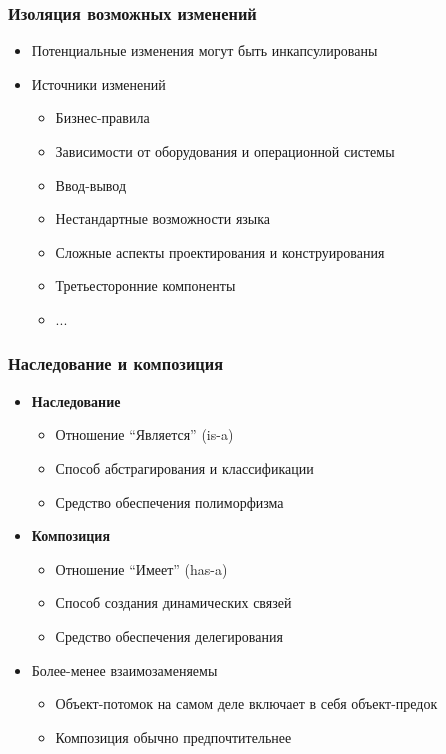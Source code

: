 \documentclass[xetex,mathserif,serif]{beamer}
\begin{document}
	\begin{frame}
		\frametitle{Изоляция возможных изменений}
		\begin{itemize}
			\item Потенциальные изменения могут быть инкапсулированы
			\item Источники изменений
			\begin{itemize}
				\item Бизнес-правила
				\item Зависимости от оборудования и операционной системы
				\item Ввод-вывод
				\item Нестандартные возможности языка
				\item Сложные аспекты проектирования и конструирования
				\item Третьесторонние компоненты
				\item ...
			\end{itemize}
		\end{itemize}
	\end{frame}

	\begin{frame}
		\frametitle{Наследование и композиция}
		\begin{itemize}
			\item \textbf{Наследование}
			\begin{itemize}
				\item Отношение ``Является'' (is-a)
				\item Способ абстрагирования и классификации
				\item Средство обеспечения полиморфизма
			\end{itemize}
			\item \textbf{Композиция}
			\begin{itemize}
				\item Отношение ``Имеет'' (has-a)
				\item Способ создания динамических связей
				\item Средство обеспечения делегирования
			\end{itemize}
			\item Более-менее взаимозаменяемы
			\begin{itemize}
				\item Объект-потомок на самом деле включает в себя объект-предок
				\item Композиция обычно предпочтительнее
			\end{itemize}
		\end{itemize}
	\end{frame}
\end{document}
